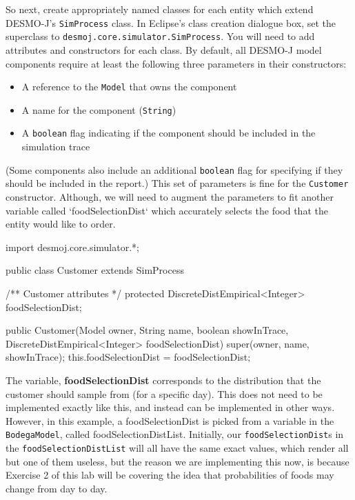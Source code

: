 \documentclass[11pt]{article}
\newcommand{\code}[1]{\texttt{#1}}
\newcommand{\class}[1]{\texttt{#1}}
\begin{document}
So next, create appropriately named classes for each entity which extend
DESMO-J's \class{SimProcess} class. In Eclipse's class creation dialogue box,
set the superclass to \class{desmoj.core.simulator.SimProcess}. You will need to
add attributes and constructors for each class. By default, all DESMO-J model
components require at least the following three parameters in their
constructors:
\begin{itemize}[noitemsep]
  \item A reference to the \class{Model} that owns the component
  \item A name for the component (\class{String})
  \item A \code{boolean} flag indicating if the component should be included
        in the simulation trace
\end{itemize}
(Some components also include an additional \code{boolean} flag for specifying
if they should be included in the report.)
%
This set of parameters is fine for the \class{Customer} constructor. Although, we will need to augment the parameters to fit another variable called `foodSelectionDist` which
accurately selects the food that the entity would like to order.
\begin{java}
import desmoj.core.simulator.*;

public class Customer extends SimProcess
{

    /** Customer attributes */
    protected DiscreteDistEmpirical<Integer> foodSelectionDist;

    public Customer(Model owner, String name, boolean showInTrace, DiscreteDistEmpirical<Integer> foodSelectionDist)
    {
        super(owner, name, showInTrace);
        this.foodSelectionDist = foodSelectionDist;
    }
}
\end{java}
The variable, \textbf{foodSelectionDist} corresponds to the distribution that the customer should sample from (for a specific day). This does not need to be implemented exactly like this, and instead can be implemented in other ways. However, in this example, a foodSelectionDist is picked from a variable in the \class{BodegaModel}, called foodSelectionDistList. Initially, our \code{foodSelectionDist}s in the \code{foodSelectionDistList} will all have the same exact values, which render all but one of them useless, but the reason we are implementing this now, is because Exercise 2 of this lab will be covering the idea that probabilities of foods may change from day to day.

\end{document}
